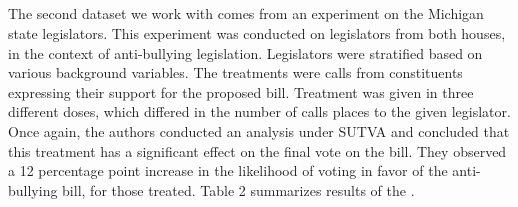 \documentclass[12pt]{article}
\begin{document}


\subsection{\citet{bergan2015call}}


The second dataset we work with comes from an experiment on the Michigan state legislators. This experiment was conducted on legislators from both houses, in the context of anti-bullying legislation. Legislators were stratified based on various background variables. The treatments were calls from constituents expressing their support for the proposed bill. Treatment was given in three different doses, which differed in the number of calls places to the given legislator. Once again, the authors conducted an analysis under SUTVA and concluded that this treatment has a significant effect on the final vote on the bill. They observed a 12 percentage point increase in the likelihood of voting in favor of the anti-bullying bill, for those treated. Table 2 summarizes results of the \citet{bergan2015call}. 
\end{document}
